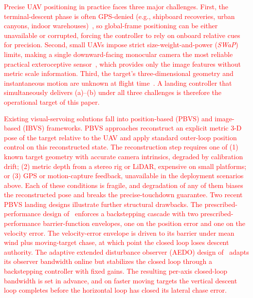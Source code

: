 \documentclass{IEEEtaes}
\newcommand{\new}[1]{\textcolor{red}{#1}}
\begin{document}
\new{Precise UAV positioning in practice faces three major challenges. First, the terminal-descent phase is often {GPS-denied} (e.g., shipboard recoveries, urban canyons, indoor warehouses)~\cite{xie2016}, so global-frame positioning can be either unavailable or corrupted, forcing the controller to rely on onboard relative cues for precision. Second, small UAVs impose strict size-weight-and-power (\emph{SWaP}) limits, making a single downward-facing monocular camera the most reliable practical exteroceptive sensor~\cite{chaumette2006, herisse2012}, which provides only the image features without metric scale information. Third, the target's three-dimensional geometry and instantaneous motion are unknown at flight time~\cite{lin2023, bouazza2025}. A landing controller that simultaneously delivers (a)--(b) under all three challenges is therefore the operational target of this paper.}

\new{Existing visual-servoing solutions fall into position-based (PBVS) and image-based (IBVS) frameworks. PBVS approaches reconstruct an explicit metric 3-D pose of the target relative to the UAV and apply standard outer-loop position control on this reconstructed state. The reconstruction step requires one of (1) known target geometry with accurate camera intrinsics, degraded by calibration drift; (2) metric depth from a stereo rig or LiDAR, expensive on small platforms; or (3) GPS or motion-capture feedback, unavailable in the deployment scenarios above. Each of these conditions is fragile, and degradation of any of them biases the reconstructed pose and breaks the precise-touchdown guarantee. Two recent PBVS landing designs illustrate further structural drawbacks. The prescribed-performance design of~\cite{lin2022} enforces a backstepping cascade with two prescribed-performance barrier-function envelopes, one on the position error and one on the velocity error. The velocity-error envelope is driven to its barrier under mean wind plus moving-target chase, at which point the closed loop loses descent authority. The adaptive extended disturbance observer (AEDO) design of~\cite{zhang2026} adapts its observer bandwidth online but stabilizes the closed loop through a backstepping controller with fixed gains. The resulting per-axis closed-loop bandwidth is set in advance, and on faster moving targets the vertical descent loop completes before the horizontal loop has closed its lateral chase error.}
\end{document}
